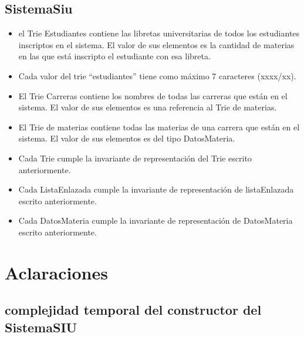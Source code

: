 \documentclass[10pt,a4paper]{article}
\begin{document}
\subsection{SistemaSiu}

\begin{itemize}
	\item el Trie Estudiantes contiene las libretas universitarias de todos los estudiantes
	      inscriptos en el sistema. El valor de sus elementos es la cantidad de materias en las que
	      está inscripto el estudiante con esa libreta.
	\item Cada valor del trie “estudiantes” tiene como máximo 7 caracteres (xxxx/xx).
	\item El Trie Carreras contiene los nombres de todas las carreras que están en el sistema.
	      El valor de sus elementos es una referencia al Trie de materias.
	\item El Trie de materias contiene todas las materias de una carrera que están en el sistema.
	      El valor de sus elementos es del tipo DatosMateria.
	\item Cada Trie cumple la invariante de representación del Trie escrito anteriormente.
	\item Cada ListaEnlazada cumple la invariante de representación de listaEnlazada escrito anteriormente.
	\item Cada DatosMateria cumple la invariante de representación de DatosMateria escrito anteriormente.
\end{itemize}


\section{Aclaraciones}

\subsection{complejidad temporal del constructor del SistemaSIU}
\end{document}
